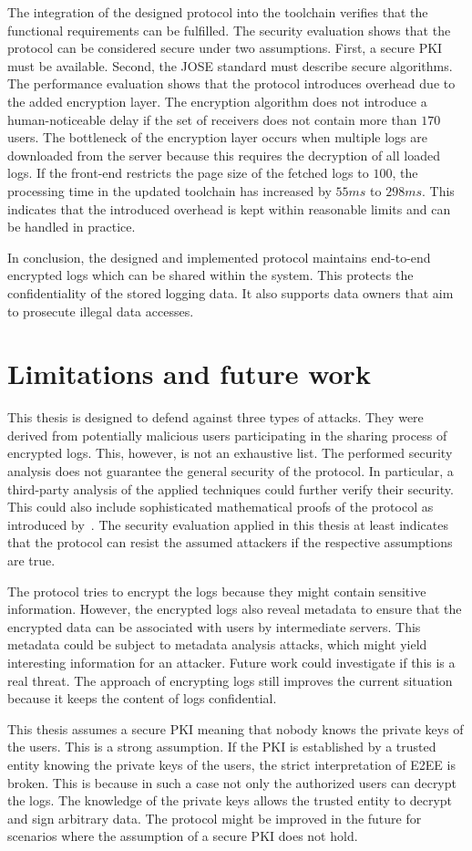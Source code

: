 \documentclass[../main.tex]{subfiles}
\begin{document}
The integration of the designed protocol into the toolchain verifies that the functional requirements can be fulfilled.
The security evaluation shows that the protocol can be considered secure under two assumptions.
First, a secure PKI must be available.
Second, the JOSE standard must describe secure algorithms.
The performance evaluation shows that the protocol introduces overhead due to the added encryption layer.
The encryption algorithm does not introduce a human-noticeable delay if the set of receivers does not contain more than $170$ users.
The bottleneck of the encryption layer occurs when multiple logs are downloaded from the server because this requires the decryption of all loaded logs.
If the front-end restricts the page size of the fetched logs to $100$, the processing time in the updated toolchain has increased by $55ms$ to $298ms$.
This indicates that the introduced overhead is kept within reasonable limits and can be handled in practice.

In conclusion, the designed and implemented protocol maintains end-to-end encrypted logs which can be shared within the system.
This protects the confidentiality of the stored logging data.
It also supports data owners that aim to prosecute illegal data accesses.

\section{Limitations and future work}
\label{sec:limitations}
This thesis is designed to defend against three types of attacks.
They were derived from potentially malicious users participating in the sharing process of encrypted logs.
This, however, is not an exhaustive list.
The performed security analysis does not guarantee the general security of the protocol.
In particular, a third-party analysis of the applied techniques could further verify their security.
This could also include sophisticated mathematical proofs of the protocol as introduced by~\cite{Katz2020}.   
The security evaluation applied in this thesis at least indicates that the protocol can resist the assumed attackers if the respective assumptions are true.

The protocol tries to encrypt the logs because they might contain sensitive information.
However, the encrypted logs also reveal metadata to ensure that the encrypted data can be associated with users by intermediate servers.
This metadata could be subject to metadata analysis attacks, which might yield interesting information for an attacker.
Future work could investigate if this is a real threat.
The approach of encrypting logs still improves the current situation because it keeps the content of logs confidential.

This thesis assumes a secure PKI meaning that nobody knows the private keys of the users.
This is a strong assumption.
If the PKI is established by a trusted entity knowing the private keys of the users, the strict interpretation of E2EE is broken.
This is because in such a case not only the authorized users can decrypt the logs.
The knowledge of the private keys allows the trusted entity to decrypt and sign arbitrary data.
The protocol might be improved in the future for scenarios where the assumption of a secure PKI does not hold.
\end{document}
